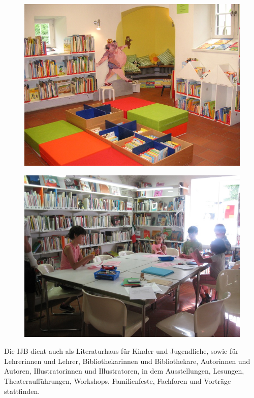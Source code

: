 \documentclass[a4paper,
fontsize=11pt,
oneside,
numbers=noperiodatend,
parskip=half-,
bibliography=totoc,
final
]{scrartcl}
\begin{document}
\begin{figure}[htbp]
\centering
\includegraphics{img/bild19.jpg}
\end{figure}

\begin{figure}[htbp]
\centering
\includegraphics{img/bild19a.jpg}
\end{figure}

Die IJB dient auch als Literaturhaus für Kinder und Jugendliche, sowie
für Lehrerinnen und Lehrer, Bibliothekarinnen und Bibliothekare,
Autorinnen und Autoren, Illustratorinnen und Illustratoren, in dem
Ausstellungen, Lesungen, Theateraufführungen, Workshops, Familienfeste,
Fachforen und Vorträge stattfinden.~
\end{document}
